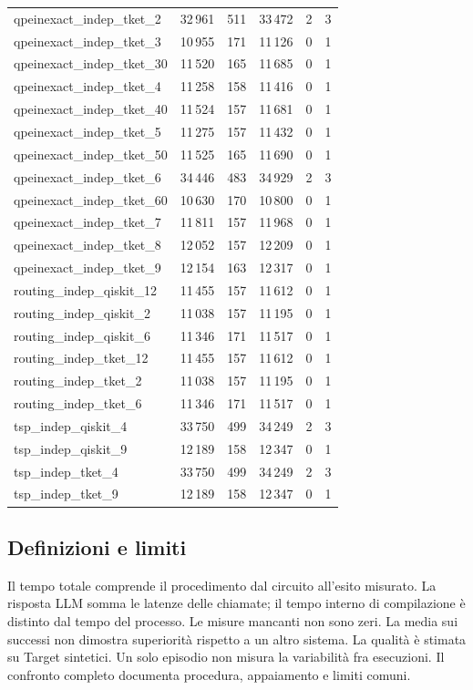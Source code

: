 \begin{longtable}{lrrrrr}
qpeinexact\_indep\_tket\_2 & 32\,961 & 511 & 33\,472 & 2 & 3 \\
qpeinexact\_indep\_tket\_3 & 10\,955 & 171 & 11\,126 & 0 & 1 \\
qpeinexact\_indep\_tket\_30 & 11\,520 & 165 & 11\,685 & 0 & 1 \\
qpeinexact\_indep\_tket\_4 & 11\,258 & 158 & 11\,416 & 0 & 1 \\
qpeinexact\_indep\_tket\_40 & 11\,524 & 157 & 11\,681 & 0 & 1 \\
qpeinexact\_indep\_tket\_5 & 11\,275 & 157 & 11\,432 & 0 & 1 \\
qpeinexact\_indep\_tket\_50 & 11\,525 & 165 & 11\,690 & 0 & 1 \\
qpeinexact\_indep\_tket\_6 & 34\,446 & 483 & 34\,929 & 2 & 3 \\
qpeinexact\_indep\_tket\_60 & 10\,630 & 170 & 10\,800 & 0 & 1 \\
qpeinexact\_indep\_tket\_7 & 11\,811 & 157 & 11\,968 & 0 & 1 \\
qpeinexact\_indep\_tket\_8 & 12\,052 & 157 & 12\,209 & 0 & 1 \\
qpeinexact\_indep\_tket\_9 & 12\,154 & 163 & 12\,317 & 0 & 1 \\
routing\_indep\_qiskit\_12 & 11\,455 & 157 & 11\,612 & 0 & 1 \\
routing\_indep\_qiskit\_2 & 11\,038 & 157 & 11\,195 & 0 & 1 \\
routing\_indep\_qiskit\_6 & 11\,346 & 171 & 11\,517 & 0 & 1 \\
routing\_indep\_tket\_12 & 11\,455 & 157 & 11\,612 & 0 & 1 \\
routing\_indep\_tket\_2 & 11\,038 & 157 & 11\,195 & 0 & 1 \\
routing\_indep\_tket\_6 & 11\,346 & 171 & 11\,517 & 0 & 1 \\
tsp\_indep\_qiskit\_4 & 33\,750 & 499 & 34\,249 & 2 & 3 \\
tsp\_indep\_qiskit\_9 & 12\,189 & 158 & 12\,347 & 0 & 1 \\
tsp\_indep\_tket\_4 & 33\,750 & 499 & 34\,249 & 2 & 3 \\
tsp\_indep\_tket\_9 & 12\,189 & 158 & 12\,347 & 0 & 1 \\
\end{longtable}
\endgroup
\begin{samepage}\subsection{Definizioni e limiti}
Il tempo totale comprende il procedimento dal circuito all’esito misurato. La risposta LLM somma le latenze delle chiamate; il tempo interno di compilazione è distinto dal tempo del processo. Le misure mancanti non sono zeri. La media sui successi non dimostra superiorità rispetto a un altro sistema. La qualità è stimata su Target sintetici. Un solo episodio non misura la variabilità fra esecuzioni. Il confronto completo documenta procedura, appaiamento e limiti comuni.
\par\end{samepage}
